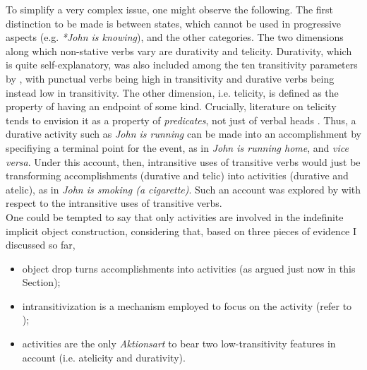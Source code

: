 To simplify a very complex issue, one might observe the following. The first distinction to be made is between states, which cannot be used in progressive aspects (e.g. \textit{*John is knowing}), and the other categories. The two dimensions along which non-stative verbs vary are durativity and telicity. Durativity, which is quite self-explanatory, was also included among the ten transitivity parameters by \textcite{HopperThompson1980}, with punctual verbs being high in transitivity and durative verbs being instead low in transitivity. The other dimension, i.e. telicity, is defined as the property of having an endpoint of some kind. Crucially, literature on telicity tends to envision it as a property of \textit{predicates}, not just of verbal heads \parencite[270]{HopperThompson1980}. Thus, a durative activity such as \textit{John is running} can be made into an accomplishment by specifiying a terminal point for the event, as in \textit{John is running home}, and \textit{vice versa}. Under this account, then, intransitive uses of transitive verbs would just be transforming accomplishments (durative and telic) into activities (durative and atelic), as in \textit{John is smoking (a cigarette)}. Such an account was explored by \textcite{Mittwoch1982} with respect to the intransitive uses of transitive verbs.\\ %
One could be tempted to say that only activities are involved in the indefinite implicit object construction, considering that, based on three pieces of evidence I discussed so far,
\begin{itemize}
    \item object drop turns accomplishments into activities (as argued just now in this Section);
    \item intransitivization is a mechanism employed to focus on the activity (refer to );
    \item activities are the only \textit{Aktionsart} to bear two low-transitivity features in  account (i.e. atelicity and durativity).
\end{itemize}
